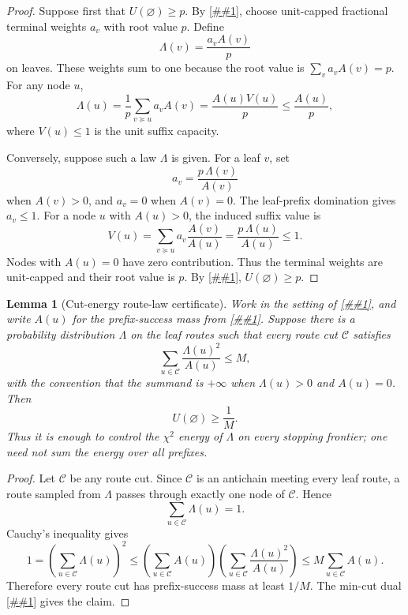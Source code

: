 \documentclass[10pt]{article}
\newcommand{\cref}[1]{\ref{##1}}
\newtheorem{lemma}[theorem]{Lemma}
\theoremstyle{definition}
\begin{document}
\begin{proof}
   Suppose first that $U(\varnothing)\ge p$. By
   \cref{lem:saturated-value-recursion}, choose unit-capped fractional
   terminal weights $a_v$ with root value $p$. Define
   \[
      \Lambda(v)=\frac{a_vA(v)}{p}
   \]
   on leaves. These weights sum to one because the root value is
   $\sum_v a_vA(v)=p$. For any node $u$,
   \[
      \Lambda(u)
      =
      \frac1p
      \sum_{v\succeq u}a_vA(v)
      =
      \frac{A(u)V(u)}p
      \le
      \frac{A(u)}p,
   \]
   where $V(u)\le1$ is the unit suffix capacity.

   Conversely, suppose such a law $\Lambda$ is given. For a leaf $v$, set
   \[
      a_v=\frac{p\,\Lambda(v)}{A(v)}
   \]
   when $A(v)>0$, and $a_v=0$ when $A(v)=0$. The leaf-prefix domination gives
   $a_v\le1$. For a node $u$ with $A(u)>0$, the induced suffix value is
   \[
      V(u)
      =
      \sum_{v\succeq u}a_v\frac{A(v)}{A(u)}
      =
      \frac{p\,\Lambda(u)}{A(u)}
      \le1.
   \]
   Nodes with $A(u)=0$ have zero contribution. Thus the terminal weights are
   unit-capped and their root value is $p$. By
   \cref{lem:saturated-value-recursion}, $U(\varnothing)\ge p$.
\end{proof}

\begin{lemma}[Cut-energy route-law certificate]\label{lem:cut-energy-route-law}
   Work in the setting of \cref{lem:saturated-value-recursion}, and write
   $A(u)$ for the prefix-success mass from
   \cref{lem:saturated-value-mincut}. Suppose there is a probability
   distribution $\Lambda$ on the leaf routes such that every route cut
   $\mathcal C$ satisfies
   \[
      \sum_{u\in\mathcal C}\frac{\Lambda(u)^2}{A(u)}\le M,
   \]
   with the convention that the summand is $+\infty$ when
   $\Lambda(u)>0$ and $A(u)=0$. Then
   \[
      U(\varnothing)\ge \frac1M .
   \]
   Thus it is enough to control the $\chi^2$ energy of $\Lambda$ on every
   stopping frontier; one need not sum the energy over all prefixes.
\end{lemma}

\begin{proof}
   Let $\mathcal C$ be any route cut. Since $\mathcal C$ is an antichain meeting
   every leaf route, a route sampled from $\Lambda$ passes through exactly one
   node of $\mathcal C$. Hence
   \[
      \sum_{u\in\mathcal C}\Lambda(u)=1 .
   \]
   Cauchy's inequality gives
   \[
      1
      =
      \left(\sum_{u\in\mathcal C}\Lambda(u)\right)^2
      \le
      \left(\sum_{u\in\mathcal C}A(u)\right)
      \left(\sum_{u\in\mathcal C}\frac{\Lambda(u)^2}{A(u)}\right)
      \le
      M\sum_{u\in\mathcal C}A(u).
   \]
   Therefore every route cut has prefix-success mass at least $1/M$. The
   min-cut dual \cref{lem:saturated-value-mincut} gives the claim.
\end{proof}
\end{document}

